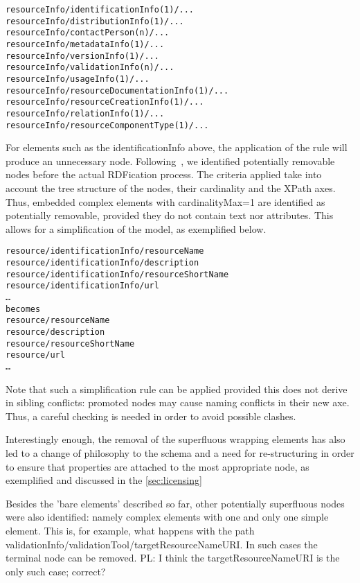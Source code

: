 \documentclass{llncs}
\begin{document}
{\footnotesize
\begin{verbatim}
resourceInfo/identificationInfo(1)/...
resourceInfo/distributionInfo(1)/...
resourceInfo/contactPerson(n)/...
resourceInfo/metadataInfo(1)/...
resourceInfo/versionInfo(1)/...
resourceInfo/validationInfo(n)/...
resourceInfo/usageInfo(1)/...
resourceInfo/resourceDocumentationInfo(1)/...
resourceInfo/resourceCreationInfo(1)/...
resourceInfo/relationInfo(1)/...
resourceInfo/resourceComponentType(1)/...
\end{verbatim}}
For elements such as the identificationInfo above, the application of the rule will produce an unnecessary node. Following~\cite{Villegas2014}, we identified potentially removable nodes before the actual RDFication process. The criteria applied take into account the tree structure of the nodes, their cardinality and the XPath axes. Thus, embedded complex elements with cardinalityMax=1 are identified as potentially removable, provided they do not contain text nor attributes. This allows for a simplification of the model, as exemplified below.
{\footnotesize
\begin{verbatim}
resource/identificationInfo/resourceName
resource/identificationInfo/description
resource/identificationInfo/resourceShortName
resource/identificationInfo/url
…
becomes
resource/resourceName
resource/description
resource/resourceShortName
resource/url
…
\end{verbatim}}
Note that such a simplification rule can be applied provided this does not derive in sibling conflicts: promoted nodes may cause naming conflicts in their new axe. Thus, a careful checking is needed in order to avoid possible clashes.

Interestingly enough, the removal of the superfluous wrapping elements has also led to a change of philosophy to the schema and a need for re-structuring in order to ensure that properties are attached to the most appropriate node, as exemplified and discussed in the \ref{sec:licensing}

Besides the 'bare elements' described so far, other potentially superfluous nodes were also identified: namely complex elements with one and only one simple element. This is, for example, what happens with the path validationInfo/validationTool/targetResourceNameURI. In such cases the terminal node can be removed.
{PL: I think the targetResourceNameURI is the only such case; correct?}
\end{document}
